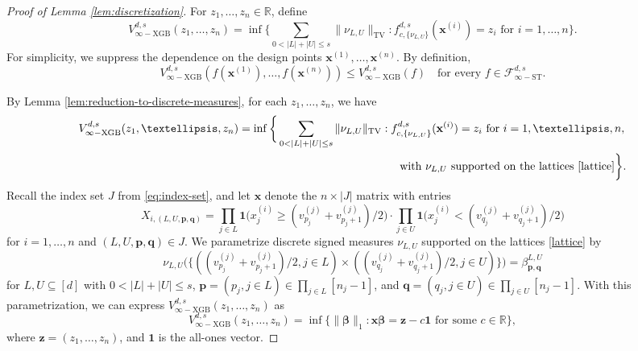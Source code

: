 \documentclass[10pt,a4paper]{amsart}
\newcommand{\R}{{\mathbb R}}
\newcommand{\betabf}{{\boldsymbol{\beta}}}
\newcommand{\fcnu}{{f^{d, s}_{c, \{\nu_{L, U}\}}}}
\newcommand{\fstinf}{{\mathcal{F}^{d, s}_{\infty-\text{ST}}}}
\newcommand{\ind}{{\mathbf{1}}}
\newcommand{\onevec}{{\mathbf{1}}}
\newcommand{\pbf}{{\mathbf{p}}}
\newcommand{\qbf}{{\mathbf{q}}}
\newcommand{\vinfxgb}{{V^{d, s}_{\infty-\text{XGB}}}}
\newcommand{\xbf}{{\mathbf{x}}}
\newcommand{\zbf}{{\mathbf{z}}}
\begin{document}
\begin{proof}[Proof of Lemma \ref{lem:discretization}]
For $z_1, \dots, z_n \in \R$, define 
\begin{equation*}
    \vinfxgb(z_1, \dots, z_n) = \inf \bigg\{ 
    \sum_{0 < |L| + |U| \le s} \|\nu_{L, U}\|_{\text{TV}}: 
    \fcnu(\xbf^{(i)}) 
    = z_i \text{ for } i = 1, \dots, n \bigg\}.
\end{equation*}
For simplicity, we suppress the dependence on the design points 
$\xbf^{(1)}, \dots, \xbf^{(n)}$.
By definition,
\begin{equation*}
    \vinfxgb(f(\xbf^{(1)}), \dots, f(\xbf^{(n)})) 
    \le \vinfxgb(f) \quad \text{for every } f \in \fstinf.
\end{equation*}

By Lemma \ref{lem:reduction-to-discrete-measures}, for each 
$z_1, \dots, z_n$, we have
\begin{equation*}
\begin{aligned}
    \vinfxgb(z_1, \dots, z_n) &= \inf \bigg\{ 
    \sum_{0 < |L| + |U| \le s} \|\nu_{L, U}\|_{\text{TV}}: 
    \fcnu(\xbf^{(i)}) 
    = z_i \text{ for } i = 1, \dots, n, \\
    &\qquad \qquad \qquad \qquad \qquad \qquad \qquad 
    \text{ with } \nu_{L, U} 
    \text{ supported on the lattices \eqref{lattice}}\bigg\}.
\end{aligned}
\end{equation*}
Recall the index set $J$ from \eqref{eq:index-set}, and let $\xbf$ 
denote the $n \times |J|$ matrix with entries
\begin{equation*}
    X_{i, (L, U, \pbf, \qbf)} 
    = \prod_{j \in L} 
    \ind\big(x^{(i)}_j \ge (v^{(j)}_{p_j} + v^{(j)}_{p_j + 1})/2\big)
    \cdot \prod_{j \in U} 
    \ind\big(x^{(i)}_j < (v^{(j)}_{q_j} + v^{(j)}_{q_j + 1})/2\big)
\end{equation*}
for $i = 1, \dots, n$ and $(L, U, \pbf, \qbf) \in J$.
We parametrize discrete signed measures $\nu_{L, U}$ 
supported on the lattices \eqref{lattice} by 
\begin{equation}\label{eq:measures-discrete-parametrization}
    \nu_{L, U} 
    \big(\{((v^{(j)}_{p_j} + v^{(j)}_{p_j + 1})/2, j \in L) 
    \times ((v^{(j)}_{q_j} + v^{(j)}_{q_j + 1})/2, j \in U)\}\big)
    = \beta^{L, U}_{\pbf, \qbf}
\end{equation}
for $L, U \subseteq [d]$ with $0 < |L| + |U| \le s$, 
$\pbf = (p_j, j \in L) \in \prod_{j \in L} [n_j - 1]$, 
and $\qbf = (q_j, j \in U) \in \prod_{j \in U} [n_j - 1]$.
With this parametrization, we can express $\vinfxgb(z_1, \dots, z_n)$ as 
\begin{equation}\label{eq:discrete-complexity}
    \vinfxgb(z_1, \dots, z_n) = \inf \big\{\|\betabf\|_1: \xbf \betabf 
    = \zbf - c \onevec \text{ for some } c \in \R\big\},
\end{equation}
where $\zbf = (z_1, \dots, z_n)$, and $\onevec$ is the all-ones 
vector.


\end{proof}
\end{document}
